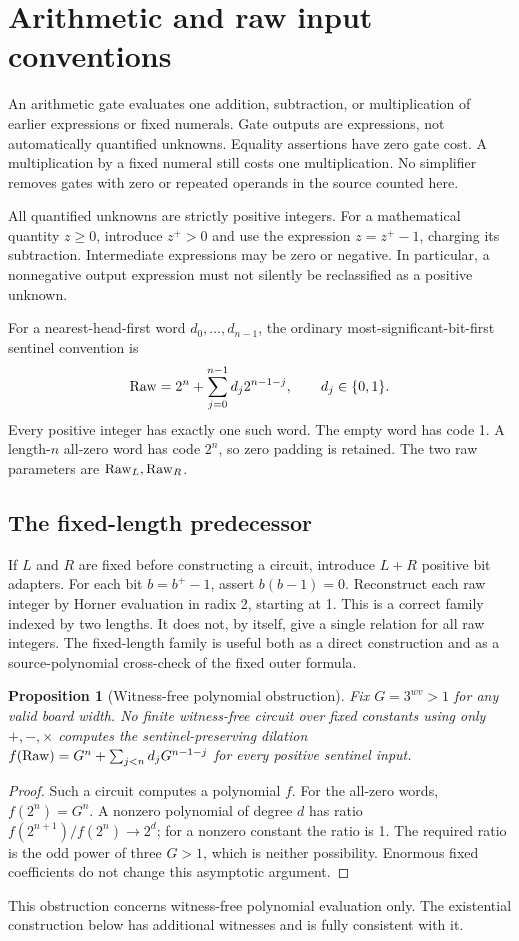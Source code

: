 \documentclass[11pt,letterpaper]{article}
\newtheorem{proposition}[theorem]{Proposition}
\theoremstyle{definition}\newtheorem{definition}[theorem]{Definition}
\theoremstyle{remark}\newtheorem{remark}[theorem]{Remark}
\begin{document}
\section{Arithmetic and raw input conventions}\label{ptr:ai:sec:conventions}
An arithmetic gate evaluates one addition, subtraction, or multiplication of earlier expressions or fixed numerals. Gate outputs are expressions, not automatically quantified unknowns. Equality assertions have zero gate cost. A multiplication by a fixed numeral still costs one multiplication. No simplifier removes gates with zero or repeated operands in the source counted here.

All quantified unknowns are strictly positive integers. For a mathematical quantity $z\ge0$, introduce $z^+>0$ and use the expression $z=z^+-1$, charging its subtraction. Intermediate expressions may be zero or negative. In particular, a nonnegative output expression must not silently be reclassified as a positive unknown.

For a nearest-head-first word $d_0,\ldots,d_{n-1}$, the ordinary most-significant-bit-first sentinel convention is
\begin{equation}\label{ptr:ai:eq:sentinel}
 \mathrm{Raw}=2^n+\sum_{j=0}^{n-1}d_j2^{n-1-j},\qquad d_j\in\{0,1\}.
\end{equation}
Every positive integer has exactly one such word. The empty word has code 1. A length-$n$ all-zero word has code $2^n$, so zero padding is retained. The two raw parameters are $\mathrm{Raw}_L,\mathrm{Raw}_R$.

\subsection{The fixed-length predecessor}
If $L$ and $R$ are fixed before constructing a circuit, introduce $L+R$ positive bit adapters. For each bit $b=b^+-1$, assert $b(b-1)=0$. Reconstruct each raw integer by Horner evaluation in radix 2, starting at 1. This is a correct family indexed by two lengths. It does not, by itself, give a single relation for all raw integers. The fixed-length family is useful both as a direct construction and as a source-polynomial cross-check of the fixed outer formula.

\begin{proposition}[Witness-free polynomial obstruction]\label{ptr:ai:prop:obstruction}
Fix $G=3^{wv}>1$ for any valid board width. No finite witness-free circuit over fixed constants using only $+,-,\times$ computes the sentinel-preserving dilation $f(\mathrm{Raw})=G^n+\sum_{j<n}d_jG^{n-1-j}$ for every positive sentinel input.
\end{proposition}
\begin{proof}
Such a circuit computes a polynomial $f$. For the all-zero words, $f(2^n)=G^n$. A nonzero polynomial of degree $d$ has ratio $f(2^{n+1})/f(2^n)\to2^d$; for a nonzero constant the ratio is 1. The required ratio is the odd power of three $G>1$, which is neither possibility. Enormous fixed coefficients do not change this asymptotic argument.
\end{proof}
This obstruction concerns witness-free polynomial evaluation only. The existential construction below has additional witnesses and is fully consistent with it.
\end{document}

